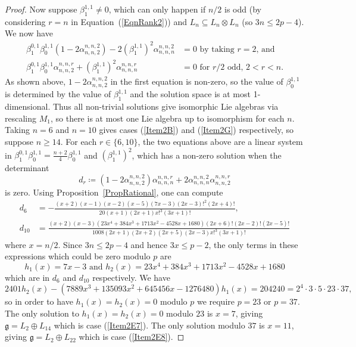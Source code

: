 \documentclass[11pt,a4paper,reqno]{amsart}
\theoremstyle{definition}
\numberwithin{equation}{section}
\newcommand{\fg}{\mathfrak{g}}
\begin{document}
\begin{proof}
Now suppose $\beta^{1,1}_1\neq0$, which can only happen if $n/2$ is odd (by considering $r=n$ in Equation~(\ref{EqnRank2})) and $L_n\subseteq L_n\otimes L_n$ (so $3n\leq2p-4$). We now have
\begin{align*}
\beta^{0,1}_1\beta^{1,1}_0(1-2\alpha^{n,n,2}_{n,n,2})-2(\beta^{1,1}_1)^2\alpha^{n,n,2}_{n,n,n}&=0\text{ by taking $r=2$, and }\\
\beta^{0,1}_1\beta^{1,1}_0\alpha^{n,n,r}_{n,n,2}+(\beta^{1,1}_1)^2\alpha^{n,n,r}_{n,n,n}&=0\text{ for $r/2$ odd, $2<r<n$.}
\end{align*}
As shown above, $1-2\alpha^{n,n,2}_{n,n,2}$ in the first equation is non-zero, so the value of $\beta^{1,1}_0$ is determined by the value of $\beta^{1,1}_1$ and the solution space is at most 1-dimensional. Thus all non-trivial solutions give isomorphic Lie algebras via rescaling $M_1$, so there is at most one Lie algebra up to isomorphism for each $n$. Taking $n=6$ and $n=10$ gives cases (\ref{Item2B}) and (\ref{Item2G}) respectively, so suppose $n\geq14$. For each $r\in\{6,10\}$, the two equations above are a linear system in $\beta^{0,1}_1\beta^{1,1}_0=\frac{n+2}4\beta^{1,1}_0$ and $(\beta^{1,1}_1)^2$, which has a non-zero solution when the determinant
\[d_r\coloneqq(1-2\alpha^{n,n,2}_{n,n,2})\alpha^{n,n,r}_{n,n,n}+2\alpha^{n,n,2}_{n,n,n}\alpha^{n,n,r}_{n,n,2}\]
is zero. Using Proposition~\ref{PropRational}, one can compute
\begin{align*}
d_6&=-\frac{(x+2)(x-1)(x-2)(x-5)(7x-3)(2x-3)!^2(2x+4)!}{20(x+1)(2x+1)x!^3(3x+1)!},\\
d_{10}&=\frac{(x+2)(x-3)(23x^4+384x^3+1713x^2-4528x+1680)(2x+6)!(2x-2)!(2x-5)!}{1008(2x+1)(2x+2)(2x+5)(2x-3)x!^3(3x+1)!}
\end{align*}
where $x=n/2$. Since $3n\leq2p-4$ and hence $3x\leq p-2$, the only terms in these expressions which could be zero modulo $p$ are
\[h_1(x)=7x-3\text{ and }h_2(x)=23x^4+384x^3+1713x^2-4528x+1680\]
which are in $d_6$ and $d_{10}$ respectively. We have
\[2401h_2(x)-(7889x^3+135093x^2+645456x-1276480)h_1(x)=204240=2^4\cdot3\cdot5\cdot23\cdot37,\]
so in order to have $h_1(x)=h_2(x)=0$ modulo $p$ we require $p=23$ or $p=37$. The only solution to $h_1(x)=h_2(x)=0$ modulo $23$ is $x=7$, giving $\fg=L_2\oplus L_{14}$ which is case (\ref{Item2E7}). The only solution modulo $37$ is $x=11$, giving $\fg=L_2\oplus L_{22}$ which is case (\ref{Item2E8}).
\end{proof}
\end{document}
